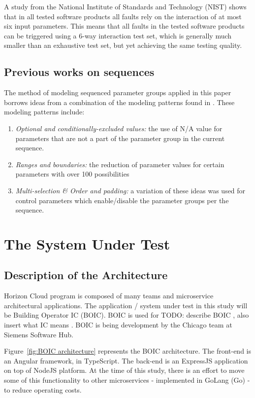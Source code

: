 \documentclass[conference]{IEEEtran}
\newcommand{\todo}[1]{}
\renewcommand{\todo}[1]{{\color{red} TODO: {#1}}}
\begin{document}
	A study from the National Institute of Standards and Technology (NIST) \cite{NISTpractical} shows
	that in all tested software products all faults rely on the interaction of at most six input parameters.
	This means that all faults in the tested software products can be triggered using a $6$-way interaction test set,
	which is generally much smaller than an exhaustive test set, but yet achieving the same testing quality.

	\subsection{Previous works on sequences}
	The method of modeling sequenced parameter groups applied in this paper borrows ideas from a combination of the modeling patterns found in \cite{segall2012common}.
	These modeling patterns include: 
	\begin{enumerate}
		\item \textit{Optional and conditionally-excluded values:} the use of N/A value for parameters that are not a part of the parameter group in the current sequence.
		\item \textit{Ranges and boundaries:} the reduction of parameter values for certain parameters with over 100 possibilities
		\item	\textit{Multi-selection \& Order and padding:} a variation of these ideas was used for control parameters which enable/disable the parameter groups per the sequence.
	\end{enumerate}

\section{The System Under Test}

	\subsection{Description of the Architecture}
	
	Horizon Cloud program is composed of many teams and microservice architectural applications.
	The application / system under test in this study will be Building Operator IC (BOIC).
	BOIC is used for \todo {describe BOIC , also insert what IC means} . BOIC is being development by the Chicago team at Siemens Software Hub. 

	Figure~\ref{fig:BOIC architecture} represents the BOIC architecture.
	The front-end is an Angular framework, in TypeScript.
	The back-end is an ExpressJS application on top of NodeJS platform. 
	At the time of this study, there is an effort to move some of this functionality to other microservices - implemented in GoLang (Go) - to reduce operating costs.
	
\end{document}

